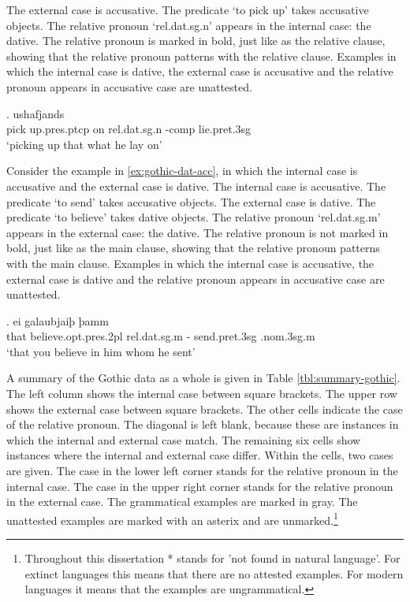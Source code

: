 The external case is accusative. The predicate  `to pick up' takes accusative objects.
The relative pronoun  `\ac{rel}.\ac{dat}.\ac{sg}.\ac{n}' appears in the internal case: the dative. The relative pronoun is marked in bold, just like as the relative clause, showing that the relative pronoun patterns with the relative clause.
Examples in which the internal case is dative, the external case is accusative and the relative pronoun appears in accusative case are unattested.

\exg. ushafjands    \\
{pick up}.\ac{pres}.\ac{ptcp}\scsub{[acc]} on\scsub{[dat]} \ac{rel}.\ac{dat}.\ac{sg}.\ac{n} -\ac{comp} lie.\ac{pret}.3\ac{sg}\\
`picking up that what he lay on' \label{ex:gothic-acc-dat}

Consider the example in \ref{ex:gothic-dat-acc}, in which the internal case is accusative and the external case is dative.
The internal case is accusative. The predicate  `to send' takes accusative objects.
The external case is dative. The predicate  `to believe' takes dative objects.
The relative pronoun  `\ac{rel}.\ac{dat}.\ac{sg}.\ac{m}' appears in the external case: the dative. The relative pronoun is not marked in bold, just like as the main clause, showing that the relative pronoun patterns with the main clause.
Examples in which the internal case is accusative, the external case is dative and the relative pronoun appears in accusative case are unattested.

\exg. ei galaubjaiþ þamm   \\
that believe.\ac{opt}.\ac{pres}.2\ac{pl}\scsub{[dat]} \ac{rel}.\ac{dat}.\ac{sg}.\ac{m} - {send}.\ac{pret}.3\ac{sg}\scsub{[acc]} .\ac{nom}.3\ac{sg}.\ac{m}\\
`that you believe in him whom he sent' \label{ex:gothic-dat-acc}

A summary of the Gothic data as a whole is given in Table \ref{tbl:summary-gothic}. The left column shows the internal case between square brackets. The upper row shows the external case between square brackets. The other cells indicate the case of the relative pronoun. The diagonal is left blank, because these are instances in which the internal and external case match.
The remaining six cells show instances where the internal and external case differ. Within the cells, two cases are given. The case in the lower left corner stands for the relative pronoun in the internal case. The case in the upper right corner stands for the relative pronoun in the external case. The grammatical examples are marked in gray. The unattested examples are marked with an asterix and are unmarked.\footnote{
Throughout this dissertation * stands for 'not found in natural language'. For extinct languages this means that there are no attested examples. For modern languages it means that the examples are ungrammatical.
}

